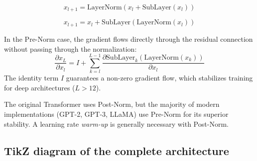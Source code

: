 \begin{definition}
\begin{equation}
x_{l+1} = \text{LayerNorm}(x_l + \text{SubLayer}(x_l))
\label{eq:post-norm}
\end{equation}
\end{definition}

\begin{definition}
\begin{equation}
x_{l+1} = x_l + \text{SubLayer}(\text{LayerNorm}(x_l))
\label{eq:pre-norm}
\end{equation}
\end{definition}

\begin{proposition}
In the Pre-Norm case, the gradient flows directly through the residual connection without passing through the normalization:
\begin{equation}
\frac{\partial x_L}{\partial x_l} = I + \sum_{k=l}^{L-1} \frac{\partial \text{SubLayer}_k(\text{LayerNorm}(x_k))}{\partial x_l}
\end{equation}
The identity term $I$ guarantees a non-zero gradient flow, which stabilizes training for deep architectures ($L > 12$).
\end{proposition}

\begin{warning}
The original Transformer uses Post-Norm, but the majority of modern implementations (GPT-2, GPT-3, LLaMA) use Pre-Norm for its superior stability. A learning rate \emph{warm-up} is generally necessary with Post-Norm.
\end{warning}

\subsection{TikZ diagram of the complete architecture}

